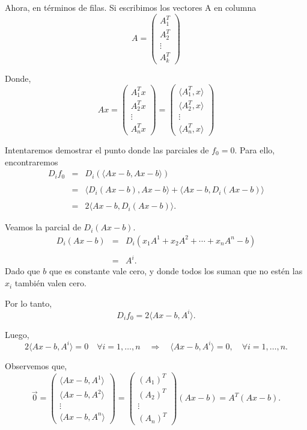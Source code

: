 \begin{ejem}
Ahora, en términos de filas. Si escribimos los vectores A en columna
$$
A = 
\begin{pmatrix}
	A^T_1\\
	A^T_2\\
	\vdots\\
	A^T_k
\end{pmatrix}
$$

Donde,
$$
Ax = 
\begin{pmatrix}
	A^T_1x\\
	A^T_2x\\
	\vdots\\
	A^T_nx
\end{pmatrix}
=
\begin{pmatrix}
	\langle A^T_1,x\rangle\\
	\langle A^T_2,x\rangle\\
	\vdots\\
	\langle A^T_n,x\rangle
\end{pmatrix}
$$

Intentaremos demostrar el punto donde las parciales de $f_0=0$. Para ello, encontraremos 
$$
\begin{array}{rcl}
    D_if_0&=&D_i\left(\langle Ax-b, Ax-b\rangle\right)\\\\
	  &=&\langle D_i\left(Ax-b\right),Ax-b\rangle+\langle Ax-b,D_i\left(Ax-b\right)\rangle\\\\
	  &=& 2\langle Ax-b,D_i\left(Ax-b\right)\rangle.
\end{array}
$$

Veamos la parcial de $D_i\left(Ax-b\right)$.
$$
\begin{array}{rcl}
    D_i\left(Ax-b\right)&=&D_i\left(x_1A^1+x_2A^2+\cdots+x_nA^n-b\right)\\\\
			&=&A^i.
\end{array}
$$
Dado que $b$ que es constante vale cero, y donde todos los suman que no estén las $x_i$ también valen cero.

Por lo tanto,
$$D_if_0 = 2\langle Ax-b,A^i \rangle.$$

Luego,
$$2\langle Ax-b,A^i \rangle = 0 \quad \forall i=1,\ldots,n \quad \Rightarrow \quad \langle Ax-b,A^i\rangle=0,\quad \forall i = 1,\ldots,n.$$

Observemos que,
$$
\overrightarrow{0} = 
\begin{pmatrix}
    \langle Ax-b,A^1\rangle\\
    \langle Ax-b,A^2\rangle\\
    \vdots\\
    \langle Ax-b,A^n\rangle
\end{pmatrix}
=
\begin{pmatrix}
    (A_1)^T\\
    (A_2)^T\\
    \vdots\\
    (A_n)^T
\end{pmatrix}
(Ax-b)
=A^T(Ax-b).
$$


\end{ejem}
